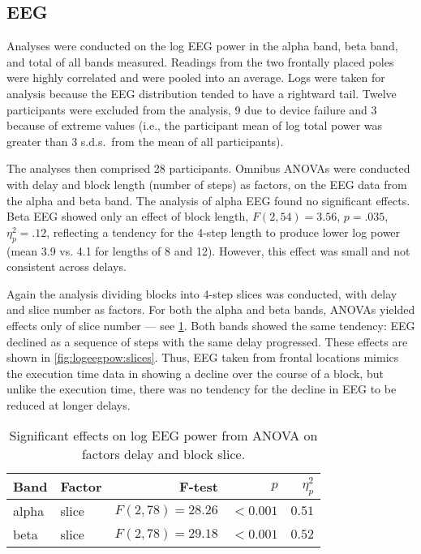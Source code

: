 \documentclass[10pt,letterpaper]{article}
\begin{document}
\subsection{EEG}
Analyses were conducted on the log EEG power in the alpha band, beta band, and total of all bands measured.
Readings from the two frontally placed poles were highly correlated and were pooled into an average.
Logs were taken for analysis because the EEG distribution tended to have a rightward tail.
Twelve participants were excluded from the analysis, 9 due to device failure and 3 because of extreme values (i.e., the participant mean of log total power was greater than 3 s.d.s.\ from the mean of all participants).

The analyses then comprised 28 participants.\@
Omnibus ANOVAs were conducted with delay and block length (number of steps) as factors, on the EEG data from the alpha and beta band.
The analysis of alpha EEG found no significant effects.
Beta EEG showed only an effect of block length, \( F(2,54) = 3.56 \), \( p = .035 \), \( \eta^{2}_{p} = .12 \), reflecting a tendency for the 4-step length to produce lower log power (mean 3.9 vs. 4.1 for lengths of 8 and 12).
However, this effect was small and not consistent across delays.  

Again the analysis dividing blocks into 4-step slices was conducted, with delay and slice number as factors.  
For both the alpha and beta bands, ANOVAs  yielded effects only of slice number --- see \cref{tab:anova:egg:alphabeta}.
Both bands showed the same tendency:  EEG declined as a sequence of steps with the same delay progressed.
These effects are shown in \cref{fig:logeegpow:slices}.
Thus, EEG taken from frontal locations mimics the execution time data in showing a decline over the course of a block, but unlike the execution time, there was no tendency for the decline in EEG to be reduced at longer delays.

\begin{table}[h]
  \centering
  \caption{Significant effects on log EEG power from ANOVA on factors delay and block slice.}\label{tab:anova:egg:alphabeta}
  \setlength{\tabcolsep}{0pt} %
  \begin{tabular*}{\columnwidth}{@{\extracolsep{\fill}\quad}llrrr}
    \toprule
    \textbf{Band} & \textbf{Factor} & \textbf{F-test} & \textbf{\(p\)} & \textbf{\( \eta^{2}_{p} \)} \\ \midrule
    alpha   & slice & \( F(2, 78) = 28.26 \) & \( <0.001 \) & \( 0.51 \) \\ %
    beta    & slice & \( F(2, 78) = 29.18 \) & \( <0.001 \) & \( 0.52 \) \\ 
    \bottomrule
  \end{tabular*}
\end{table}
\end{document}
